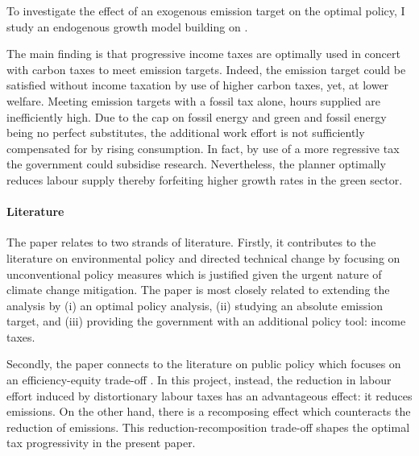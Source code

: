 To investigate the effect of an exogenous emission target on the optimal policy, I study an endogenous growth model building on \cite{Fried2018ClimateAnalysis}. 

The main finding is that progressive income taxes are optimally used in concert with carbon taxes to meet emission targets. Indeed, the emission target could be satisfied without income taxation by use of higher carbon taxes, yet, at lower welfare.  
Meeting emission targets with a fossil tax alone, hours supplied are inefficiently high. Due to the cap on fossil energy and green and fossil energy being no perfect substitutes, the additional work effort is not sufficiently compensated for by rising consumption.  
In fact, by use of a more regressive tax the government could subsidise research. Nevertheless, the planner optimally reduces labour supply thereby forfeiting higher growth rates in the green sector. %

\paragraph{Literature}
The paper relates to two strands of literature. Firstly, it contributes to the literature on environmental policy and directed technical change \citep[e.g.][]{Acemoglu2012TheChange, Acemoglu2016TransitionTechnology} by focusing on unconventional policy measures which is justified given the urgent nature of climate change mitigation.  The paper is most closely related to \cite{Fried2018ClimateAnalysis} extending the analysis by (i) an optimal policy analysis, (ii) studying an absolute emission target, and (iii) providing the government with an additional policy tool: income taxes.

Secondly, the paper connects to the literature on public policy which focuses on an efficiency-equity trade-off \citep{Heathcote2017OptimalFramework, Loebbing2019NationalChange}. In this project, instead, the reduction in labour effort induced by distortionary labour taxes has an advantageous effect: it reduces emissions. On the other hand, there is a recomposing effect which counteracts the reduction of emissions. This reduction-recomposition trade-off shapes the optimal tax progressivity in the present paper. 

